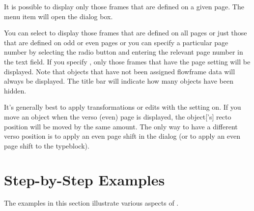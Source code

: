 
It is possible to display only those frames that are defined on a
given page. The  menu item will
open the  dialog box.


You can select to display those frames that are defined
on all pages or just those that are defined on odd or even pages or
you can specify a particular page number by selecting the
 radio button and entering the
relevant page number in the text field. If you specify , only
those frames that have the  page
setting will be displayed.  Note that \glspl{object} that have not
been assigned \gls{flowframe} data will always be displayed.  The title
bar will indicate how many objects have been hidden.

It's generally best to apply transformations or edits with the
 setting on. If you move an \gls{object}
when the \gls{verso} (even) page is displayed, the \gls*{object}['s]
\gls{recto} position will be moved by the same amount. The only way
to have a different \gls*{verso} position is to apply an even page
shift in the  dialog (or to apply an even page
shift to the \gls{typeblock}).

\chapter{Step-by-Step Examples}\label{sec:tutorials}

The examples in this section illustrate various aspects of
\FlowframTk.

